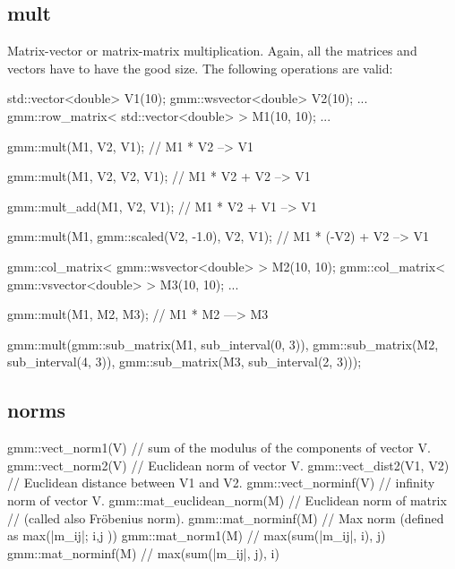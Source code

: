 \documentclass[11pt,a4paper]{article}
\begin{document}
\subsection{mult}
 
Matrix-vector or matrix-matrix multiplication. Again, all the matrices and vectors have to have the good size. The following operations are valid:
\begin{cppcode}
  std::vector<double> V1(10);
  gmm::wsvector<double> V2(10);
  ...
  gmm::row_matrix< std::vector<double> > M1(10, 10);
  ...

  gmm::mult(M1, V2, V1);  // M1 * V2 --> V1

  gmm::mult(M1, V2, V2, V1);  // M1 * V2 + V2 --> V1

  gmm::mult_add(M1, V2, V1);  // M1 * V2 + V1 --> V1

  gmm::mult(M1, gmm::scaled(V2, -1.0), V2, V1);  // M1 * (-V2) + V2 --> V1

  gmm::col_matrix< gmm::wsvector<double> > M2(10, 10);
  gmm::col_matrix< gmm::vsvector<double> > M3(10, 10);
  ...
  
  gmm::mult(M1, M2, M3); // M1 * M2 ---> M3
  
  gmm::mult(gmm::sub_matrix(M1, sub_interval(0, 3)),
            gmm::sub_matrix(M2, sub_interval(4, 3)),
            gmm::sub_matrix(M3, sub_interval(2, 3)));

\end{cppcode}

\subsection{norms}

\begin{cppcode}
  gmm::vect_norm1(V)  // sum of the modulus of the components of vector V.\\
  gmm::vect_norm2(V)  // Euclidean norm of vector V.
  gmm::vect_dist2(V1, V2)  // Euclidean distance between V1 and V2.
  gmm::vect_norminf(V)    // infinity norm of vector V.
  gmm::mat_euclidean_norm(M) // Euclidean norm of matrix 
                             // (called also Fr\"obenius norm).
  gmm::mat_norminf(M) // Max norm (defined as max(|m_ij|; i,j ))
  gmm::mat_norm1(M)   // max(sum(|m_ij|, i), j)
  gmm::mat_norminf(M) // max(sum(|m_ij|, j), i)

\end{cppcode}
\end{document}
